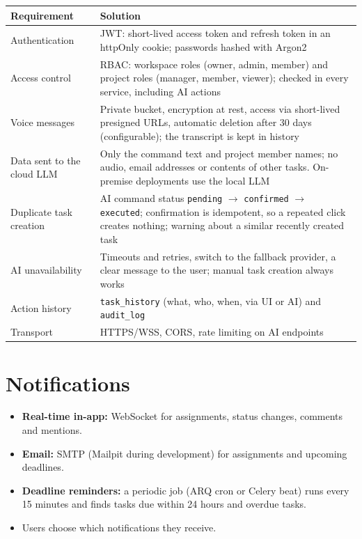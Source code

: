 \documentclass[11pt,a4paper]{article}
\newcommand{\tblstart}{\small\rowcolors{2}{gray!7}{white}}
\newcommand{\code}[1]{\texttt{#1}}
\begin{document}
{\tblstart
\begin{xltabular}{\textwidth}{P{4cm} L}
\toprule
\textbf{Requirement} & \textbf{Solution} \\
\midrule
\endhead
Authentication & JWT: short-lived access token and refresh token in an httpOnly cookie; passwords hashed with Argon2 \\
Access control & RBAC: workspace roles (owner, admin, member) and project roles (manager, member, viewer); checked in every service, including AI actions \\
Voice messages & Private bucket, encryption at rest, access via short-lived presigned URLs, automatic deletion after 30 days (configurable); the transcript is kept in history \\
Data sent to the cloud LLM & Only the command text and project member names; no audio, email addresses or contents of other tasks. On-premise deployments use the local LLM \\
Duplicate task creation & AI command status \code{pending} $\rightarrow$ \code{confirmed} $\rightarrow$ \code{executed}; confirmation is idempotent, so a repeated click creates nothing; warning about a similar recently created task \\
AI unavailability & Timeouts and retries, switch to the fallback provider, a clear message to the user; manual task creation always works \\
Action history & \code{task\_history} (what, who, when, via UI or AI) and \code{audit\_log} \\
Transport & HTTPS/WSS, CORS, rate limiting on AI endpoints \\
\bottomrule
\end{xltabular}}

\section{Notifications}

\begin{itemize}
  \item \textbf{Real-time in-app:} WebSocket for assignments, status changes, comments and mentions.
  \item \textbf{Email:} SMTP (Mailpit during development) for assignments and upcoming deadlines.
  \item \textbf{Deadline reminders:} a periodic job (ARQ cron or Celery beat) runs every 15 minutes and finds tasks due within 24 hours and overdue tasks.
  \item Users choose which notifications they receive.
\end{itemize}
\end{document}
